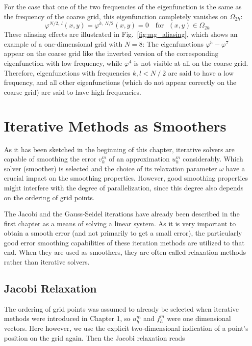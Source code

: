 For the case that one of the two frequencies of the eigenfunction is the same as the frequency of the coarse grid, this eigenfunction completely vanishes on $\Omega_{2h}$:
\begin{equation}
\varphi^{N/2,~l}(x,y) = \varphi^{k,~N/2}(x,y) = 0  \text{~~~for~~}  (x,y) \in \Omega_{2h} 
\end{equation}
These aliasing effects are illustrated in Fig.~\ref{fig:mg_aliasing}, which shows an example of a one-dimensional grid with $N = 8$:  The eigenfunctions $\varphi^5-\varphi^7$ appear on the coarse grid like the inverted version of the corresponding eigenfunction with low frequency, while $\varphi^4$ is not visible at all on the coarse grid.
Therefore, eigenfunctions with frequencies $k, l < N~/~2$ are said to have a low frequency, and all other eigenfunctions (which do not appear correctly on the coarse grid) are said to have high frequencies.





\section{Iterative Methods as Smoothers}
As it has been sketched in the beginning of this chapter, iterative solvers are capable of smoothing the error $v_h^m$ of an approximation $u_h^m$ considerably. Which solver (smoother) is selected and the choice of its relaxation parameter $\omega$ have a crucial impact on the smoothing properties. However, good smoothing properties might interfere with the degree of parallelization, since this degree also depends on the ordering of grid points.

The Jacobi and the Gauss-Seidel iterations have already been described in the first chapter as a means of solving a linear system. As it is very important to obtain a smooth error (and not primarily to get a small error), the particularly good error smoothing capabilities of these iteration methods are utilized to that end. When they are used as smoothers, they are often called relaxation methods rather than iterative solvers. 


\subsection{Jacobi Relaxation}
The ordering of grid points was assumed to already be selected when iterative methods were introduced in Chapter 1, so $u_h^m$ and $f_h^m$ were one dimensional vectors. Here however, we use the explicit two-dimensional indication of a point's position on the grid again. Then the Jacobi relaxation reads 


